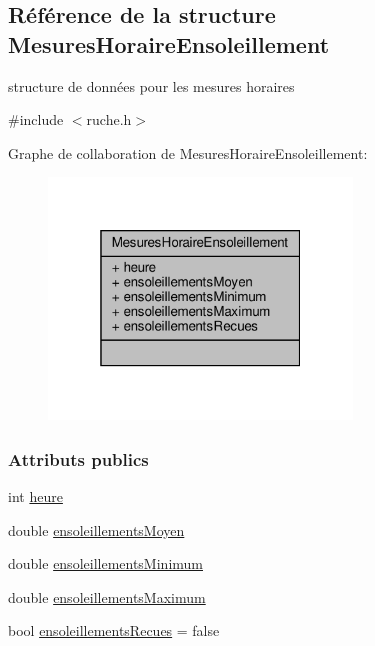 \hypertarget{struct_mesures_horaire_ensoleillement}{}\subsection{Référence de la structure Mesures\+Horaire\+Ensoleillement}
\label{struct_mesures_horaire_ensoleillement}


structure de données pour les mesures horaires  




{\ttfamily \#include $<$ruche.\+h$>$}



Graphe de collaboration de Mesures\+Horaire\+Ensoleillement\+:\nopagebreak
\begin{figure}[H]
\begin{center}
\leavevmode
\includegraphics[width=229pt]{struct_mesures_horaire_ensoleillement__coll__graph}
\end{center}
\end{figure}
\subsubsection*{Attributs publics}
\begin{DoxyCompactItemize}
\item 
int \hyperlink{struct_mesures_horaire_ensoleillement_a478cf936fa746f384445cf5077206454}{heure}
\item 
double \hyperlink{struct_mesures_horaire_ensoleillement_a41c11dd16f5e42cf8b4882f98b9cee49}{ensoleillements\+Moyen}
\item 
double \hyperlink{struct_mesures_horaire_ensoleillement_a5d1165f40806663a3fd40ee4408c78f1}{ensoleillements\+Minimum}
\item 
double \hyperlink{struct_mesures_horaire_ensoleillement_adc848a942c5dcb0984b4c346f07e6f09}{ensoleillements\+Maximum}
\item 
bool \hyperlink{struct_mesures_horaire_ensoleillement_a78d40966edb1ace93776ba33edfc5151}{ensoleillements\+Recues} = false
\end{DoxyCompactItemize}


